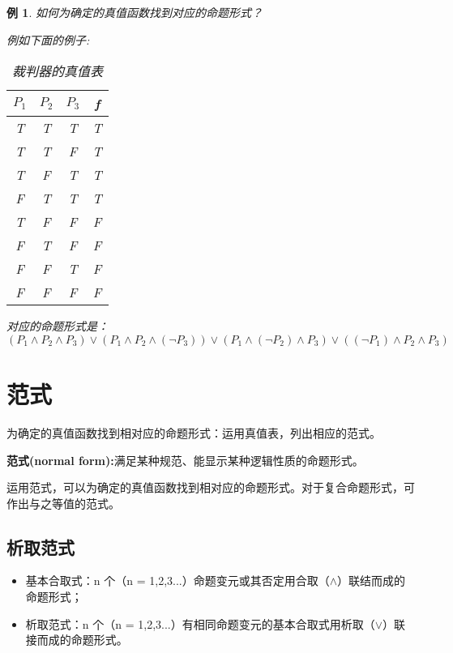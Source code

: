 \documentclass[12pt,onecolumn,a4paper]{book}
\newtheorem*{example}{例}
\numberwithin{table}{subsection}
\numberwithin{equation}{subsection}
\begin{document}
\begin{example}
    如何为确定的真值函数找到对应的命题形式？

    例如下面的例子:
    \begin{table}[h]
        \centering
        \begin{tabular}{ccc|c}
        \toprule
        $P_1$ & $P_2$ & $P_3$ & f \\ \midrule
        T     & T     & T     & T \\
        T     & T     & F     & T \\
        T     & F     & T     & T \\
        F     & T     & T     & T \\
        T     & F     & F     & F \\
        F     & T     & F     & F \\
        F     & F     & T     & F \\
        F     & F     & F     & F \\
        \bottomrule
        \end{tabular}
    \caption{裁判器的真值表}
    \end{table}

    对应的命题形式是：
    \begin{equation}
        (P_1\wedge P_2\wedge P_3)\vee(P_1\wedge P_2\wedge(\neg P_3))\vee(P_1\wedge(\neg P_2)\wedge P_3)\vee((\neg P_1)\wedge P_2\wedge P_3)
    \end{equation}
\end{example}

\section{范式}
为确定的真值函数找到相对应的命题形式：运用真值表，列出相应的范式。

\textbf{范式(normal form):}满足某种规范、能显示某种逻辑性质的命题形式。

运用范式，可以为确定的真值函数找到相对应的命题形式。对于复合命题形式，可作出与之等值的范式。

\subsection{析取范式}


\begin{itemize}[itemsep=0pt,parsep=0pt]
    \item 基本合取式：n 个（n = 1,2,3...）命题变元或其否定用合取（$\wedge$）联结而成的命题形式；
    \item 析取范式：n 个（n  =  1,2,3...）有相同命题变元的基本合取式用析取（$\vee$）联接而成的命题形式。
\end{itemize}
\end{document}
